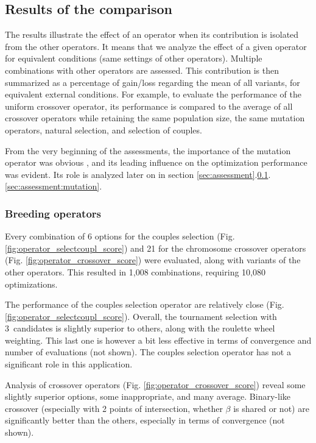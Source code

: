 \documentclass{ametsoc}
\begin{document}
\subsection{Results of the comparison}
\label{sec:assessment:results}

The results illustrate the effect of an operator when its contribution is isolated from the other operators. It means that we analyze the effect of a given operator for equivalent conditions (same settings of other operators). Multiple combinations with other operators are assessed. This contribution is then summarized as a percentage of gain/loss regarding the mean of all variants, for equivalent external conditions. For example, to evaluate the performance of the uniform crossover operator, its performance is compared to the average of all crossover operators while retaining the same population size, the same mutation operators, natural selection, and selection of couples.

From the very beginning of the assessments, the importance of the mutation operator was obvious \cite[see][for the details]{Horton2012a}, and its leading influence on the optimization performance was evident. Its role is analyzed later on in section \ref{sec:assessment}.\ref{sec:assessment:results}.\ref{sec:assessment:mutation}.

\subsubsection{Breeding operators}

Every combination of 6 options for the couples selection (Fig. \ref{fig:operator_selectcoupl_score}) and 21 for the chromosome crossover operators (Fig. \ref{fig:operator_crossover_score}) were evaluated, along with variants of the other operators. This resulted in 1,008 combinations, requiring 10,080 optimizations.

The performance of the couples selection operator are relatively close (Fig. \ref{fig:operator_selectcoupl_score}). Overall, the tournament selection with 3~candidates is slightly superior to others, along with the roulette wheel weighting. This last one is however a bit less effective in terms of convergence and number of evaluations (not shown). The couples selection operator has not a significant role in this application. 

Analysis of crossover operators (Fig. \ref{fig:operator_crossover_score}) reveal some slightly superior options, some inappropriate, and many average. Binary-like crossover (especially with 2 points of intersection, whether $\beta$ is shared or not) are significantly better than the others, especially in terms of convergence (not shown).
	
\end{document}
